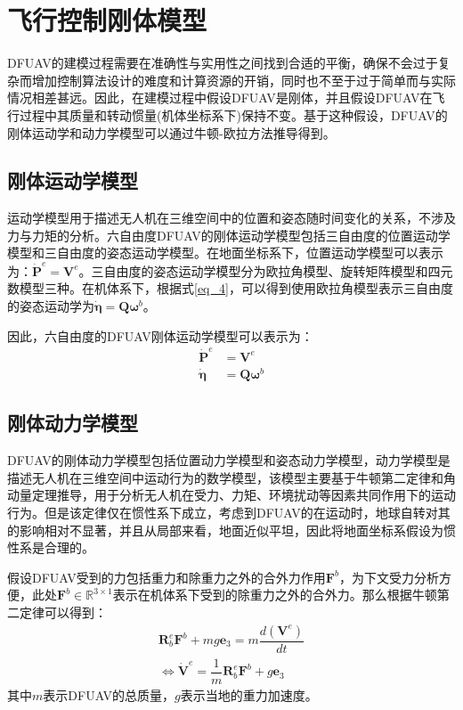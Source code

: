 \section{飞行控制刚体模型}

DFUAV的建模过程需要在准确性与实用性之间找到合适的平衡，确保不会过于复杂而增加控制算法设计的难度和计算资源的开销，同时也不至于过于简单而与实际情况相差甚远。因此，在建模过程中假设DFUAV是刚体，并且假设DFUAV在飞行过程中其质量和转动惯量(机体坐标系下)保持不变。基于这种假设，DFUAV的刚体运动学和动力学模型可以通过牛顿-欧拉方法推导得到。

\subsection{刚体运动学模型}

运动学模型用于描述无人机在三维空间中的位置和姿态随时间变化的关系，不涉及力与力矩的分析。六自由度DFUAV的刚体运动学模型包括三自由度的位置运动学模型和三自由度的姿态运动学模型。在地面坐标系下，位置运动学模型可以表示为：$\boldsymbol{\dot{P}}^{e} = \boldsymbol{V}^{e}$。三自由度的姿态运动学模型分为欧拉角模型、旋转矩阵模型和四元数模型三种。在机体系下，根据式\eqref{eq_4}，可以得到使用欧拉角模型表示三自由度的姿态运动学为$\dot{\boldsymbol{\eta}}=\boldsymbol{Q}\boldsymbol{\omega}^b$。

因此，六自由度的DFUAV刚体运动学模型可以表示为：
\begin{equation}
    \begin{aligned}
    \boldsymbol{\dot{P}}^{e} &= \boldsymbol{V}^{e} \\
    \dot{\boldsymbol{\eta}}&=\boldsymbol{Q}\boldsymbol{\omega}^b
    \end{aligned}
    \label{eq_6}
\end{equation}

\subsection{刚体动力学模型}

DFUAV的刚体动力学模型包括位置动力学模型和姿态动力学模型，动力学模型是描述无人机在三维空间中运动行为的数学模型，该模型主要基于牛顿第二定律和角动量定理推导，用于分析无人机在受力、力矩、环境扰动等因素共同作用下的运动行为。但是该定律仅在惯性系下成立，考虑到DFUAV的在运动时，地球自转对其的影响相对不显著，并且从局部来看，地面近似平坦，因此将地面坐标系假设为惯性系是合理的。

假设DFUAV受到的力包括重力和除重力之外的合外力作用$\boldsymbol{F}^b$，为下文受力分析方便，此处$\boldsymbol{F}^b\in\mathbb{R}^{3\times1}$表示在机体系下受到的除重力之外的合外力。那么根据牛顿第二定律可以得到：
\begin{equation}
    \begin{gathered}
    \boldsymbol{R}_b^e\boldsymbol{F}^b + mg\boldsymbol{e}_3 = m\dfrac{d({\boldsymbol{V}}^e)}{dt}
    \\
    \Leftrightarrow\dot{\boldsymbol{V}}^e=\dfrac{1}{m}\boldsymbol{R}_b^e\boldsymbol{F}^b + g\boldsymbol{e}_3 
    \label{eq_7}
    \end{gathered}
\end{equation}
其中$m$表示DFUAV的总质量，$g$表示当地的重力加速度。


